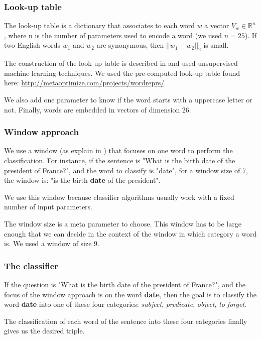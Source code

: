 \subsubsection{Look-up table}

The look-up table is a dictionary that associates to each word $w$ a vector $V_w \in \mathbb{R}^n$, where n is the number of parameters used to encode a word (we used $n=25$).
If two English words $w_1$ and $w_2$ are synonymous, then $||w_1-w_2||_2$ is small.

The construction of the look-up table is described in \cite{collobert} and used unsupervised machine learning techniques.
We used the pre-computed look-up table found here: \url{http://metaoptimize.com/projects/wordreprs/}

We also add one parameter to know if the word starts with a uppercase letter or not. Finally, words are embedded in vectors of dimension 26. 

\subsubsection{Window approach}

We use a window (as explain in \cite{collobert}) that focuses on one word to perform the classification. For instance, if the sentence is "What is the birth date of the president of France?", and the word to classify is "date", for a window size of 7, the window is: "is the birth \textbf{date} of the president".

We use this window because classifier algorithms usually work with a fixed number of input parameters. 

The window size is a meta parameter to choose. This window has to be large enough that we can decide in the context of the window in which category a word is. We used a window of size 9.

\subsubsection{The classifier}

If the question is "What is the birth date of the president of France?", and the focus of the window approach is on the word \textbf{date}, then the goal is to classify the word \textbf{date} into one of these four categories: \textit{subject}, \textit{predicate}, \textit{object}, \textit{to forget}.

The classification of each word of the sentence into these four categories finally gives us the desired triple.

